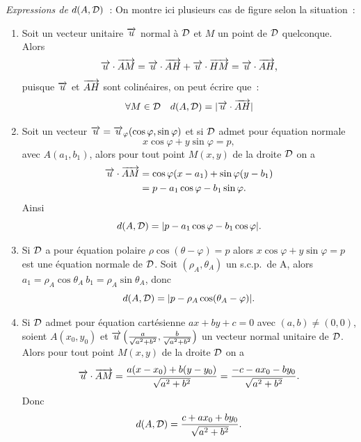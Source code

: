 \emph{Expressions de \(d(A,\mathcal{D})\)}~:
On montre ici plusieurs cas de figure selon la situation~:
\begin{enumerate}
\item Soit un vecteur unitaire \(\overrightarrow{u}\) normal à \(\mathcal{D}\) et \(M\) un point de \(\mathcal{D}\) quelconque. Alors
  \begin{equation}
    \overrightarrow{u} \cdot \overrightarrow{AM} = \overrightarrow{u} \cdot \overrightarrow{AH} + \overrightarrow{u} \cdot \overrightarrow{HM}=\overrightarrow{u} \cdot \overrightarrow{AH},
  \end{equation}
  puisque \(\overrightarrow{u}\) et \(\overrightarrow{AH}\) sont colinéaires, on peut écrire que~:
  \begin{equation}
    \forall M \in \mathcal{D} \quad d(A,\mathcal{D})=|\overrightarrow{u} \cdot \overrightarrow{AH}|
  \end{equation}
\item Soit un vecteur \(\overrightarrow{u}=\overrightarrow{u}_\varphi(\cos \varphi, \sin \varphi)\) et si \(\mathcal{D}\) admet pour équation normale
  \begin{equation}
    x \cos \varphi + y \sin \varphi=p,
  \end{equation}
  avec \(A(a_1,b_1)\), alors pour tout point \(M(x,y)\) de la droite \(\mathcal{D}\) on a
  \begin{align}
    \overrightarrow{u} \cdot \overrightarrow{AM} &= \cos \varphi (x-a_1) + \sin \varphi (y-b_1)\\
    &= p-a_1\cos\varphi -b_1\sin\varphi.
  \end{align}
  Ainsi
  \begin{equation}
    d(A,\mathcal{D})=|p-a_1\cos\varphi-b_1\cos\varphi|.
  \end{equation}
\item Si \(\mathcal{D}\) a pour équation polaire \(\rho\cos(\theta-\varphi)=p\) alors \(x \cos \varphi + y \sin \varphi=p\) est une équation normale de \(\mathcal{D}\). Soit \((\rho_A,\theta_A)\) un s.c.p.\ de A, alors \(a_1=\rho_A\cos\theta_A \ b_1=\rho_A\sin\theta_A\), donc
  \begin{equation}
    d(A,\mathcal{D})=|p-\rho_A\cos(\theta_A-\varphi)|.
  \end{equation}
\item Si \(\mathcal{D}\) admet pour équation cartésienne \(ax+by+c=0\) avec \((a,b) \neq (0,0)\), soient \(A(x_0,y_0)\) et \(\overrightarrow{u} \left(\frac{a}{\sqrt{a^2+b^2}}, \frac{b}{\sqrt{a^2+b^2}}\right)\) un vecteur normal unitaire de \(\mathcal{D}\). Alors pour tout point \(M(x,y)\) de la droite \(\mathcal{D}\) on a
  \begin{equation}
      \overrightarrow{u}\cdot\overrightarrow{AM}=\frac{a(x-x_0)+b(y-y_0)}{\sqrt{a^2+b^2}}=\frac{-c-ax_0-by_0}{\sqrt{a^2+b^2}}.
    \end{equation}
    Donc
    \begin{equation}
      d(A,\mathcal{D})=\frac{c+ax_0+by_0}{\sqrt{a^2+b^2}}.
    \end{equation}
  \end{enumerate}
  
